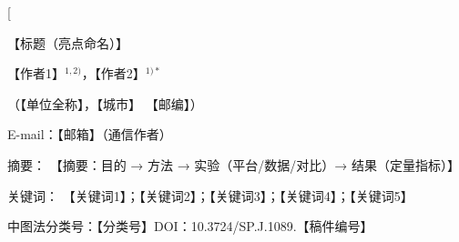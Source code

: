 \documentclass[twocolumn,10pt]{ctexart}
\let\songti\songfamily
\let\heiti\heifamily
\let\fangsong\fangfamily
\begin{document}
\pagestyle{plain}

\twocolumn[%
\begin{center}
  {\heiti{} 【标题（亮点命名）】}\par
  \vspace{6pt}
  {\fangsong{} 【作者1】$^{1,2)}$，【作者2】$^{1)*}$}\par
  \vspace{4pt}
  {\songti\fontsize{8}{12}\selectfont（【单位全称】，【城市】 【邮编】）}\par
  \vspace{2pt}
  {\songti\fontsize{8}{12}\selectfont E-mail：【邮箱】（通信作者）}\par
  \vspace{8pt}
\end{center}
\begin{flushleft}
  {\heiti\fontsize{8.5}{13}\selectfont 摘\quad 要：}{\songti\fontsize{8.5}{13}\selectfont
  【摘要：目的 → 方法 → 实验（平台/数据/对比）→ 结果（定量指标）】}\par
  \vspace{4pt}
  {\heiti\fontsize{8.5}{13}\selectfont 关键词：}{\songti\fontsize{8.5}{13}\selectfont
  【关键词1】；【关键词2】；【关键词3】；【关键词4】；【关键词5】}\par
  \vspace{2pt}
  {\songti\fontsize{8.5}{13}\selectfont 中图法分类号：【分类号】\qquad DOI：10.3724/SP.J.1089.【稿件编号】}\par
  \vspace{6pt}
\end{flushleft}
\end{document}
